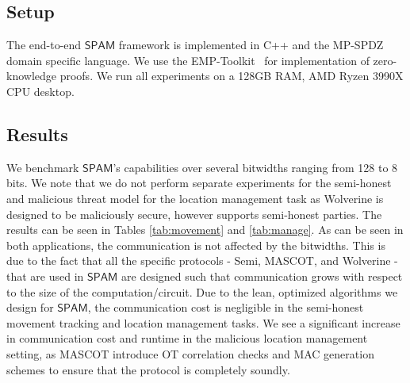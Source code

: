 \documentclass[9pt,sigconf,screen]{acmart}
\newcommand{\nojan}[1]{\textcolor{red}{{\sf (NS:} {\sl{#1})}}}
\newcommand\sys{$\mathsf{SPAM}$\xspace}
\begin{document}
\subsection{Setup}
The end-to-end \sys framework is implemented in C++ and the MP-SPDZ domain specific language.
We use the EMP-Toolkit~\cite{emp} for implementation of zero-knowledge proofs.
We run all experiments on a 128GB RAM, AMD Ryzen 3990X CPU desktop.
\subsection{Results}

We benchmark \sys's capabilities over several bitwidths ranging from 128 to 8 bits. We note that we do not perform separate experiments for the semi-honest and malicious threat model for the location management task as Wolverine is designed to be maliciously secure, however supports semi-honest parties. The results can be seen in Tables \ref{tab:movement} and \ref{tab:manage}. As can be seen in both applications, the communication is not affected by the bitwidths. This is due to the fact that all the specific protocols - Semi, MASCOT, and Wolverine - that are used in \sys are designed such that communication grows with respect to the size of the computation/circuit. Due to the lean, optimized algorithms we design for \sys, the communication cost is negligible in the semi-honest movement tracking and location management tasks. We see a significant increase in communication cost and runtime in the malicious location management setting, as MASCOT introduce OT correlation checks and MAC generation schemes to ensure that the protocol is completely soundly.
\end{document}
